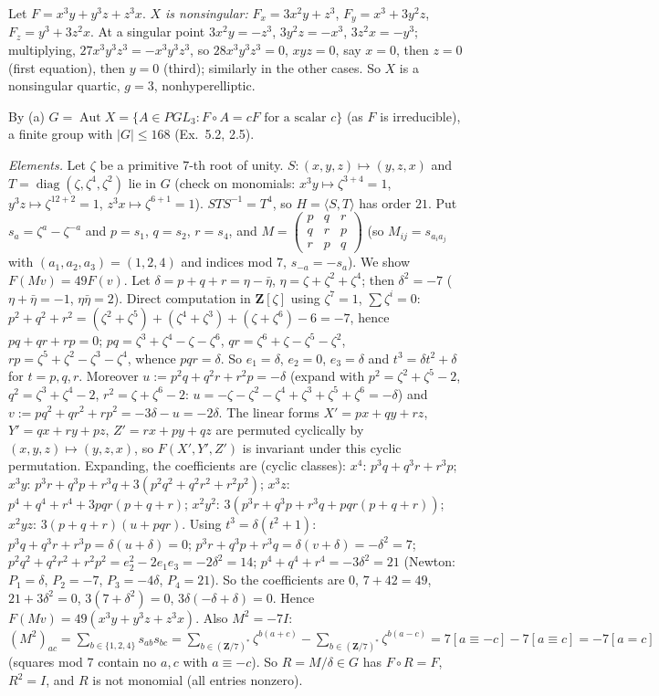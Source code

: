 \documentclass[11pt]{article}
\begin{document}
Let $F=x^3y+y^3z+z^3x$. \emph{$X$ is nonsingular:} $F_x=3x^2y+z^3$, $F_y=x^3+3y^2z$, $F_z=y^3+3z^2x$. At a singular point $3x^2y=-z^3$, $3y^2z=-x^3$, $3z^2x=-y^3$; multiplying, $27x^3y^3z^3=-x^3y^3z^3$, so $28x^3y^3z^3=0$, $xyz=0$, say $x=0$, then $z=0$ (first equation), then $y=0$ (third); similarly in the other cases. So $X$ is a nonsingular quartic, $g=3$, nonhyperelliptic.

By (a) $G=\operatorname{Aut}X=\{A\in PGL_3:F\circ A=cF\text{ for a scalar }c\}$ (as $F$ is irreducible), a finite group with $|G|\le168$ (Ex.~5.2, 2.5).

\emph{Elements.} Let $\zeta$ be a primitive $7$-th root of unity. $S:(x,y,z)\mapsto(y,z,x)$ and $T=\operatorname{diag}(\zeta,\zeta^4,\zeta^2)$ lie in $G$ (check on monomials: $x^3y\mapsto\zeta^{3+4}=1$, $y^3z\mapsto\zeta^{12+2}=1$, $z^3x\mapsto\zeta^{6+1}=1$). $STS^{-1}=T^4$, so $H=\langle S,T\rangle$ has order $21$. Put $s_a=\zeta^a-\zeta^{-a}$ and $p=s_1$, $q=s_2$, $r=s_4$, and $M=\begin{pmatrix}p&q&r\\q&r&p\\r&p&q\end{pmatrix}$ (so $M_{ij}=s_{a_ia_j}$ with $(a_1,a_2,a_3)=(1,2,4)$ and indices mod $7$, $s_{-a}=-s_a$). We show $F(Mv)=49F(v)$. Let $\delta=p+q+r=\eta-\bar\eta$, $\eta=\zeta+\zeta^2+\zeta^4$; then $\delta^2=-7$ ($\eta+\bar\eta=-1$, $\eta\bar\eta=2$). Direct computation in $\mathbf Z[\zeta]$ using $\zeta^7=1$, $\sum\zeta^i=0$: $p^2+q^2+r^2=(\zeta^2+\zeta^5)+(\zeta^4+\zeta^3)+(\zeta+\zeta^6)-6=-7$, hence $pq+qr+rp=0$; $pq=\zeta^3+\zeta^4-\zeta-\zeta^6$, $qr=\zeta^6+\zeta-\zeta^5-\zeta^2$, $rp=\zeta^5+\zeta^2-\zeta^3-\zeta^4$, whence $pqr=\delta$. So $e_1=\delta$, $e_2=0$, $e_3=\delta$ and $t^3=\delta t^2+\delta$ for $t=p,q,r$. Moreover $u:=p^2q+q^2r+r^2p=-\delta$ (expand with $p^2=\zeta^2+\zeta^5-2$, $q^2=\zeta^3+\zeta^4-2$, $r^2=\zeta+\zeta^6-2$: $u=-\zeta-\zeta^2-\zeta^4+\zeta^3+\zeta^5+\zeta^6=-\delta$) and $v:=pq^2+qr^2+rp^2=-3\delta-u=-2\delta$.
The linear forms $X'=px+qy+rz$, $Y'=qx+ry+pz$, $Z'=rx+py+qz$ are permuted cyclically by $(x,y,z)\mapsto(y,z,x)$, so $F(X',Y',Z')$ is invariant under this cyclic permutation. Expanding, the coefficients are (cyclic classes): $x^4$: $p^3q+q^3r+r^3p$; $x^3y$: $p^3r+q^3p+r^3q+3(p^2q^2+q^2r^2+r^2p^2)$; $x^3z$: $p^4+q^4+r^4+3pqr(p+q+r)$; $x^2y^2$: $3(p^3r+q^3p+r^3q+pqr(p+q+r))$; $x^2yz$: $3(p+q+r)(u+pqr)$. Using $t^3=\delta(t^2+1)$: $p^3q+q^3r+r^3p=\delta(u+\delta)=0$; $p^3r+q^3p+r^3q=\delta(v+\delta)=-\delta^2=7$; $p^2q^2+q^2r^2+r^2p^2=e_2^2-2e_1e_3=-2\delta^2=14$; $p^4+q^4+r^4=-3\delta^2=21$ (Newton: $P_1=\delta$, $P_2=-7$, $P_3=-4\delta$, $P_4=21$). So the coefficients are $0$, $7+42=49$, $21+3\delta^2=0$, $3(7+\delta^2)=0$, $3\delta(-\delta+\delta)=0$. Hence $F(Mv)=49(x^3y+y^3z+z^3x)$. Also $M^2=-7I$: $(M^2)_{ac}=\sum_{b\in\{1,2,4\}}s_{ab}s_{bc}=\sum_{b\in(\mathbf Z/7)^*}\zeta^{b(a+c)}-\sum_{b\in(\mathbf Z/7)^*}\zeta^{b(a-c)}=7[a\equiv-c]-7[a\equiv c]=-7[a=c]$ (squares mod $7$ contain no $a,c$ with $a\equiv-c$). So $R=M/\delta\in G$ has $F\circ R=F$, $R^2=I$, and $R$ is not monomial (all entries nonzero).
\end{document}
